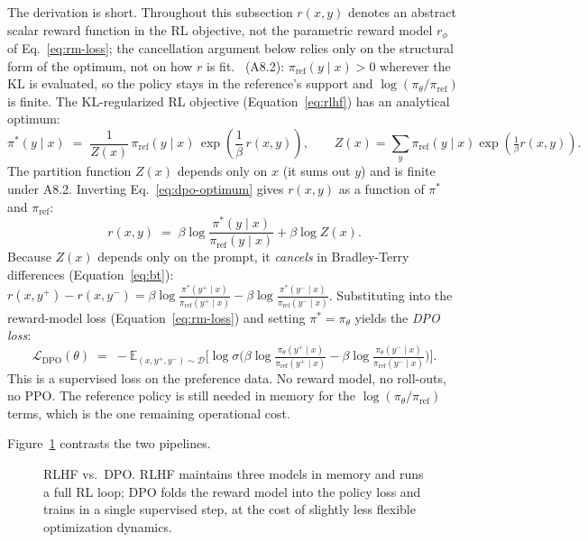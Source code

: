 The derivation is short. Throughout this subsection $r(x,y)$
denotes an abstract scalar reward function in the RL objective, not
the parametric reward model $r_\phi$ of Eq.~\eqref{eq:rm-loss};
the cancellation argument below relies only on the structural form
of the optimum, not on how $r$ is fit. \Assum\ (A8.2):
$\pi_{\mathrm{ref}}(y\mid x) > 0$ wherever the KL is evaluated, so
the policy stays in the reference's support and
$\log(\pi_\theta/\pi_{\mathrm{ref}})$ is finite. The
KL-regularized RL objective (Equation~\ref{eq:rlhf}) has an
analytical optimum:
\begin{equation}
  \pi^*(y \mid x)
  \;=\;
  \frac{1}{Z(x)}\, \pi_\text{ref}(y \mid x)\, \exp\!\left(\frac{1}{\beta}\, r(x, y)\right),
  \qquad
  Z(x) = \sum_{y}
    \pi_{\mathrm{ref}}(y\mid x)\exp\!\left(\tfrac{1}{\beta} r(x,y)\right).
  \label{eq:dpo-optimum}
\end{equation}
The partition function $Z(x)$ depends only on $x$ (it sums out $y$)
and is finite under A8.2. Inverting Eq.~\eqref{eq:dpo-optimum} gives
$r(x, y)$ as a function of $\pi^*$ and $\pi_\text{ref}$:
\begin{equation}
  r(x, y) \;=\; \beta \log \frac{\pi^*(y \mid x)}{\pi_\text{ref}(y \mid x)} + \beta \log Z(x).
  \label{eq:implicit-reward}
\end{equation}
Because $Z(x)$ depends only on the prompt, it \emph{cancels} in
Bradley-Terry differences (Equation~\ref{eq:bt}):
$r(x,y^+) - r(x,y^-) = \beta\log\tfrac{\pi^*(y^+\mid x)}{\pi_{\mathrm{ref}}(y^+\mid x)}
- \beta\log\tfrac{\pi^*(y^-\mid x)}{\pi_{\mathrm{ref}}(y^-\mid x)}$.
Substituting into the reward-model loss (Equation~\ref{eq:rm-loss})
and setting $\pi^* = \pi_\theta$ yields the \emph{DPO loss}:
\begin{equation}
  \mathcal{L}_\text{DPO}(\theta)
  \;=\;
  -\mathbb{E}_{(x, y^+, y^-) \sim \mathcal{D}}
  \Big[
    \log \sigma\Big(\beta \log \tfrac{\pi_\theta(y^+ \mid x)}{\pi_\text{ref}(y^+ \mid x)}
                 - \beta \log \tfrac{\pi_\theta(y^- \mid x)}{\pi_\text{ref}(y^- \mid x)}\Big)
  \Big].
  \label{eq:dpo}
\end{equation}
This is a supervised loss on the preference data. No reward model,
no roll-outs, no PPO. The reference policy is still needed in
memory for the $\log(\pi_\theta / \pi_\text{ref})$ terms, which is
the one remaining operational cost.

Figure~\ref{fig:dpo-vs-rlhf} contrasts the two pipelines.

\begin{figure}[ht]
  \centering
  
  \caption{RLHF vs.\ DPO. RLHF maintains three models in memory and
  runs a full RL loop; DPO folds the reward model into the policy
  loss and trains in a single supervised step, at the cost of
  slightly less flexible optimization dynamics.}
  \label{fig:dpo-vs-rlhf}
\end{figure}

